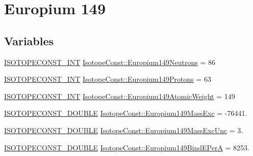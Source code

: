 \hypertarget{group___isotope_const-_europium-_eu149}{}\section{Europium 149}
\label{group___isotope_const-_europium-_eu149}
\subsection*{Variables}
\begin{DoxyCompactItemize}
\item 
\mbox{\hyperlink{group___isotope_const-_macros_ga5f18360b3e99483a35c32d789e62621c}{I\+S\+O\+T\+O\+P\+E\+C\+O\+N\+S\+T\+\_\+\+I\+NT}} \mbox{\hyperlink{group___isotope_const-_europium-_eu149_ga45e074cdfb31dc0fc09cca040dfdd267}{Isotope\+Const\+::\+Europium149\+Neutrons}} = 86
\item 
\mbox{\hyperlink{group___isotope_const-_macros_ga5f18360b3e99483a35c32d789e62621c}{I\+S\+O\+T\+O\+P\+E\+C\+O\+N\+S\+T\+\_\+\+I\+NT}} \mbox{\hyperlink{group___isotope_const-_europium-_eu149_gaa5070544d2b40e56c9835db8cab260b2}{Isotope\+Const\+::\+Europium149\+Protons}} = 63
\item 
\mbox{\hyperlink{group___isotope_const-_macros_ga5f18360b3e99483a35c32d789e62621c}{I\+S\+O\+T\+O\+P\+E\+C\+O\+N\+S\+T\+\_\+\+I\+NT}} \mbox{\hyperlink{group___isotope_const-_europium-_eu149_ga9e164475c12a170a08156fd6e6950033}{Isotope\+Const\+::\+Europium149\+Atomic\+Weight}} = 149
\item 
\mbox{\hyperlink{group___isotope_const-_macros_ga8f45a7272ce02c0b4c65c44636ed719a}{I\+S\+O\+T\+O\+P\+E\+C\+O\+N\+S\+T\+\_\+\+D\+O\+U\+B\+LE}} \mbox{\hyperlink{group___isotope_const-_europium-_eu149_ga89e289ef2a08e60add945b146dc042a3}{Isotope\+Const\+::\+Europium149\+Mass\+Exc}} = -\/76441.
\item 
\mbox{\hyperlink{group___isotope_const-_macros_ga8f45a7272ce02c0b4c65c44636ed719a}{I\+S\+O\+T\+O\+P\+E\+C\+O\+N\+S\+T\+\_\+\+D\+O\+U\+B\+LE}} \mbox{\hyperlink{group___isotope_const-_europium-_eu149_gaf37fdfe555460e65941f5710bcb1b33a}{Isotope\+Const\+::\+Europium149\+Mass\+Exc\+Unc}} = 3.
\item 
\mbox{\hyperlink{group___isotope_const-_macros_ga8f45a7272ce02c0b4c65c44636ed719a}{I\+S\+O\+T\+O\+P\+E\+C\+O\+N\+S\+T\+\_\+\+D\+O\+U\+B\+LE}} \mbox{\hyperlink{group___isotope_const-_europium-_eu149_ga68c908ff9477b7fb03a73c0a13467168}{Isotope\+Const\+::\+Europium149\+Bind\+E\+PerA}} = 8253.
\item 

\end{DoxyCompactItemize}
